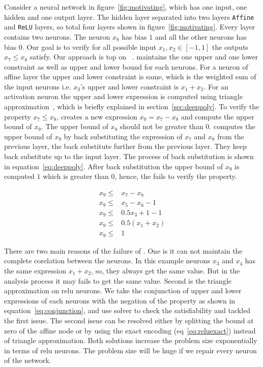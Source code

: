 Consider a neural network in figure~\ref{fig:motivating}, 
which has one input, one hidden and one output layer. The hidden layer separated into two layers 
\texttt{Affine} and \texttt{ReLU} layers, so total four layers shown in figure~\ref{fig:motivating}. 
Every layer contains two neurons. The neuron $x_8$ has bias $1$ and all the other neurons has bias $0$. 
Our goal is to verify for all possible input $x_1,x_2 \in [-1,1]$ the outputs $x_7 \leq x_8$ satisfy. 
Our approach is top on \deeppoly{}~\cite{singh2019abstract}. \deeppoly{} maintains the one upper and one lower constraint
as well as upper and lower bound for each neurons. For a neuron of affine layer the upper and lower constraint is 
same, which is the weighted sum of the input neurons i.e. $x_3$'s upper and lower constraint is $x_1+x_2$. 
For an activation neuron the upper and lower expression is computed using triangle approximation~\cite{singh2019abstract}, 
which is briefly explained in section~\ref{sec:deeppoly}. To verify the property $x_7 \leq x_8$, \deeppoly{} creates a 
new expression $x_9 = x_7 - x_8$ and compute the upper bound of $x_9$. The upper bound of $x_9$ should not be greater
than $0$. \deeppoly{} computes the upper bound of $x_9$ by back substituting the expression of $x_7$ and $x_8$ 
from the previous layer, the back substitute further from the previous layer. They keep back substitute 
up to the input layer. The process of back substitution is shown in equation~\ref{eq:deeppoly}.
After back substitution the upper bound of $x_9$ is computed $1$ which is greater than $0$, 
hence, the \deeppoly{} fails to verify the property. 


\begin{equation}
    \begin{aligned}
        x_9 \leq  &  x_7 - x_8 \\
        x_9 \leq  & x_5 - x_6 - 1 \\
        x_9 \leq  & 0.5x_3 + 1 - 1 \\
        x_9 \leq  & 0.5(x_1+x_2) \\
        x_9 \leq  & 1
    \end{aligned}
\label{eq:deeppoly}
\end{equation}

There are two main reasons of the failure of \deeppoly{}. One is it can not maintain the complete corelation 
between the neurons. In this example neurons $x_3$ and $x_4$ has the same expression $x_1+x_2$, so, they always
get the same value. But in the \deeppoly{} analysis process it may fails to get the same value. Second is the triangle
approximation on relu neurons.
We take the conjunction of upper and lower expressions of each neurons with the negation of the property
as shown in equation~\ref{eq:conjunction},
and use \milp{} solver to check the satisfiability and tackled the first issue. 
The second issue can be resolved either by splitting the 
bound at zero of the affine node or by using the exact encoding (eq~\ref{eq:reluexact}) instead of triangle approximation.
Both solutions increase the problem size exponentially in terms of relu neurons. 
The problem size will be huge if we repair every neuron of the network. 

